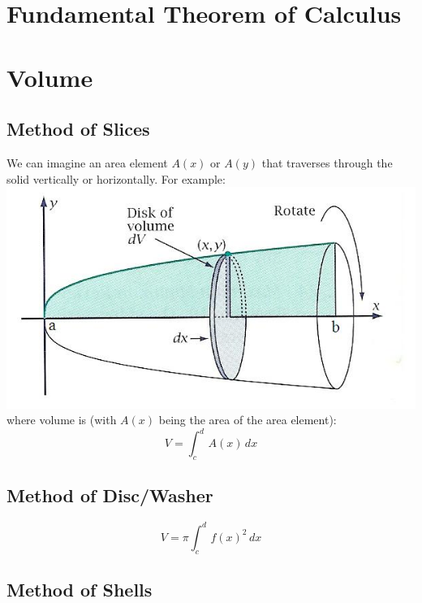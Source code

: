 \documentclass{article}
\begin{document}
\section{Fundamental Theorem of Calculus}

\section{Volume}
\subsection*{Method of Slices}
We can imagine an area element $A(x)$ or $A(y)$ that traverses through the solid vertically or horizontally. For example:
\\
\includegraphics[scale=0.6]{volume1.jpeg}
\\
where volume is (with $A(x)$ being the area of the area element):
\[V = \int_{c}^{d} \, A(x) \, dx \]

\subsection*{Method of Disc/Washer}
\[V = \pi \int_{c}^{d} \, f(x)^2 \, dx \]

\subsection*{Method of Shells}
\end{document}
